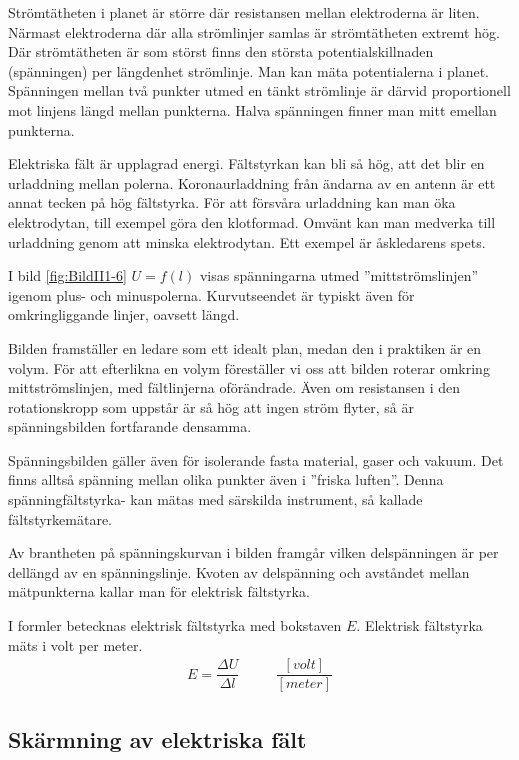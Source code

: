 Strömtätheten i planet är större där resistansen mellan elektroderna är liten.
Närmast elektroderna där alla strömlinjer samlas är strömtätheten extremt hög.
Där strömtätheten är som störst finns den största potentialskillnaden
(spänningen) per längdenhet strömlinje.
Man kan mäta potentialerna i planet.
Spänningen mellan två punkter utmed en tänkt strömlinje är därvid proportionell
mot linjens längd mellan punkterna.
Halva spänningen finner man mitt emellan punkterna.

Elektriska fält är upplagrad energi.
Fältstyrkan kan bli så hög, att det blir en urladdning mellan polerna.
Koronaurladdning från ändarna av en antenn är ett annat tecken på hög
fältstyrka.
För att försvåra urladdning kan man öka elektrodytan, till exempel göra den klotformad.
Omvänt kan man medverka till urladdning genom att minska elektrodytan.
Ett exempel är åskledarens spets.

I bild \ref{fig:BildII1-6} \(U = f(l)\) visas spänningarna utmed
''mittströmslinjen'' igenom plus- och minuspolerna.
Kurvutseendet är typiskt även för omkringliggande linjer, oavsett längd.

Bilden framställer en ledare som ett idealt plan, medan den i praktiken är en
volym.
För att efterlikna en volym föreställer vi oss att bilden roterar omkring
mittströmslinjen, med fältlinjerna oförändrade.
Även om resistansen i den rotationskropp som uppstår är så hög att ingen ström
flyter, så är spänningsbilden fortfarande densamma.

Spänningsbilden gäller även för isolerande fasta material, gaser och vakuum.
Det finns alltså spänning mellan olika punkter även i ''friska luften''.
Denna spänningfältstyrka- kan mätas med särskilda instrument, så kallade
fältstyrkemätare.

Av brantheten på spänningskurvan i bilden framgår vilken delspänningen är per
dellängd av en spänningslinje.
Kvoten av delspänning och avståndet mellan mätpunkterna kallar man för
elektrisk fältstyrka.

I formler betecknas elektrisk fältstyrka med bokstaven \(E\).
Elektrisk fältstyrka mäts i volt per meter.
\[
\begin{array}{ccc}
E=\dfrac{\Delta U}{\Delta l} &\quad& \dfrac{[volt]}{[meter]}
\end{array}
\]
\subsection{Skärmning av elektriska fält}
\label{elektrostatik skärmning}

